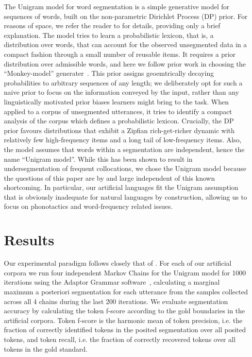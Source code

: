 \documentclass[11pt]{article}
\begin{document}
The Unigram model for word segmentation is a simple generative model for sequences of words, built on the non-parametric Dirichlet Process (DP) prior. For reasons of space, we refer the reader to \cite{Goldwater07c} for details, providing only a brief explanation. The model tries to learn a probabilistic lexicon, that is, a distribution over words, that can account for the observed unsegmented data in a compact fashion through a small number of reusable items. It requires a prior distribution over admissible words, and here we follow prior work in choosing the ``Monkey-model'' generater~\cite{Brent99a,Goldwater07c}. This prior assigns geoemtrically decaying probabilities to arbitrary sequences of any length; we deliberately opt for such a naive prior to focus on the information conveyed by the input, rather than any linguistically motivated prior biases learners might bring to the task. When applied to a corpus of unsegmented utterances, it tries to identify a compact analysis of the corpus which defines a probabilistic lexicon. Crucially, the DP prior favours distributions that exhibit a Zipfian rich-get-richer dynamic with relatively few high-frequency items and a long tail of low-frequency items. Also, the model assumes that words within a segmentation are independent, hence the name ``Unigram model''. While this has been shown to result in undersegmentation of frequent collocations, we chose the Unigram model because the questions of this paper are by and large independent of this known shortcoming. In particular, our artificial languages fit the Unigram assumption that is obviously inadequate for natural languages by construction, allowing us to focus on phonotactics and word-frequency related issues.

\section{Results}
\vspace*{-5pt}
Our experimental paradigm follows closely that of \cite{Johnson09a}. For each of our artificial corpora we run four independent Markov Chains for the Unigram model for 1000 iterations using the Adaptor Grammar software~\cite{Johnson07c}, calculating a marginal maximum a posteriori segmentation for each utterance from the samples collected across all 4 chains during the last 200 iterations. We evaluate segmentation accuracy by calculating the token f-score according to the gold boundaries in the artificial corpora. Token f-score is the harmonic mean of token precision, i.e. the fraction of correctly identified tokens in the posited segmentation over all posited tokens, and token recall, i.e. the fraction of correctly recovered tokens over all tokens in the gold standard. 
\end{document}
